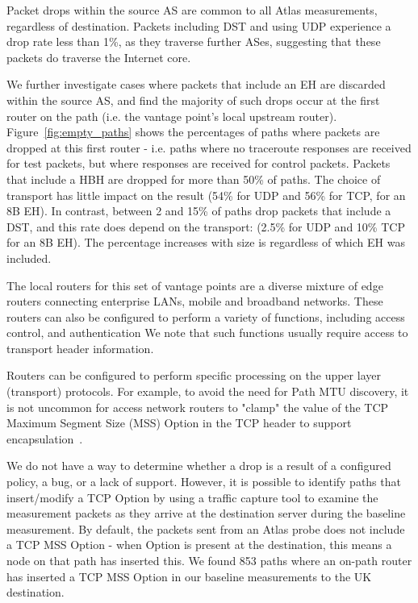 \documentclass[conference]{IEEEtran}
\begin{document}
Packet drops within the source AS are common to all Atlas measurements, regardless of destination. Packets including DST and using UDP experience a drop rate less than 1\%, as they traverse further  ASes, suggesting that these packets do traverse the Internet core.

We further investigate cases where packets that include an EH are discarded within the source AS, and find the majority of such drops occur at the first router on the path (i.e. the vantage point's local upstream router).
Figure~\ref{fig:empty_paths} shows the percentages of paths where packets are dropped at this first router - i.e. paths where no traceroute responses are received for test packets, but where responses are received for control packets. Packets that include a HBH are dropped for more than 50\% of paths. The choice of transport has little impact on the result (54\% for UDP and 56\% for TCP, for an 8B EH). In contrast, between 2 and 15\% of paths drop packets that include a DST, and this rate does depend on the transport: (2.5\% for UDP and 10\% TCP for an 8B EH). The percentage increases with size  is regardless of which EH was included.


The local routers for this set of vantage points are a diverse mixture of edge routers connecting enterprise LANs, mobile and broadband networks. These routers can also be configured to perform a variety of functions, including access control, and authentication We note that such functions usually require access to transport header information. 

Routers can be configured to perform specific processing on the upper layer (transport) protocols. For example, to avoid the need for Path MTU discovery, it is not uncommon for access network routers to "clamp" the value of the TCP Maximum Segment Size (MSS) Option in the TCP header to support encapsulation~\cite{custura-mtu}. 


We do not have a way to determine whether a drop is a result of a configured policy, a bug, or a lack of support. 
However, it is possible to identify paths that insert/modify a TCP Option by using a traffic capture tool to examine the measurement packets as they arrive at the destination server during the baseline measurement. By default, the packets sent from an Atlas probe does not include a TCP MSS Option - when Option is present at the destination, this means a node on that path has inserted this. We found 853 paths where an on-path router has inserted a TCP MSS Option in our baseline measurements to the UK destination. 
\end{document}
